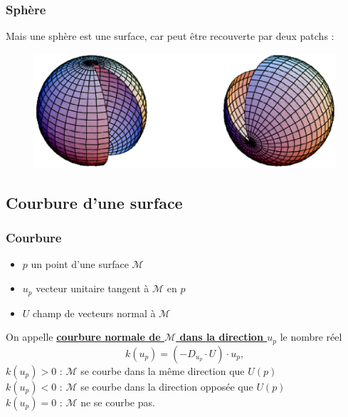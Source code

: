 \documentclass{beamer}
\newcommand{\gs}[1]{\textbf{\underline{#1}}}
\begin{document}
\begin {frame}
\frametitle{Sphère}
Mais une sphère est une surface, car peut être recouverte par deux patchs : 
\pause
\begin{figure}[h!]
      \centering 
      \includegraphics[scale=0.5]{1.eps}
\end{figure}
\end {frame}

\subsection{Courbure d'une surface}

\begin {frame}
  \frametitle{Courbure}
  \begin{itemize}
  \item $p$ un point d'une surface $\mathscr{M}$
  \item $u_p$ vecteur unitaire tangent à $\mathscr{M}$ en $p$
  \item $U$ champ de vecteurs normal à $\mathscr{M}$\\
  \end{itemize}
\pause
On appelle \gs{courbure normale de $\mathscr{M}$ dans la direction $u_p$} le nombre réel
$$k(u_p)=(-D_{u_p}\cdot U)\cdot u_p, $$
\pause
$k(u_p)>0$ :  $\mathscr{M}$ se courbe dans la même direction que $U(p)$ \\
$k(u_p)<0$ :  $\mathscr{M}$ se courbe dans la direction opposée que $U(p)$ \\
$k(u_p)=0$ : $\mathscr{M}$ ne se courbe pas.
\end{frame}
\end{document}
